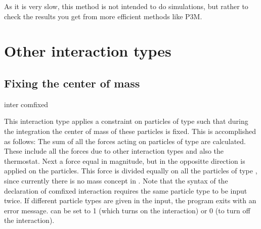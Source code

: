 As it is very slow, this method is not intended to do simulations,
but rather to check the results you get from more efficient methods
like P3M.
  
\section{Other interaction types}
\label{sec:inter-other}

\subsection{Fixing the center of mass}
\begin{essyntax}
  inter   comfixed 
  \begin{features}
  \end{features}
\end{essyntax}
This interaction type applies a constraint on particles of type
 such that during the integration the center of mass of
these particles is fixed. This is accomplished as follows: The sum of
all the forces acting on particles of type  are
calculated. These include all the forces due to other interaction
types and also the thermostat. Next a force equal in magnitude, but in
the oppositte direction is applied on the particles. This force is
divided equally on all the particles of type , since
currently there is no mass concept in \es. Note that the syntax of the
declaration of comfixed interaction requires the same particle type to
be input twice. If different particle types are given in the input,
the program exits with an error message.  can be set to 1
(which turns on the interaction) or 0 (to turn off the interaction).

